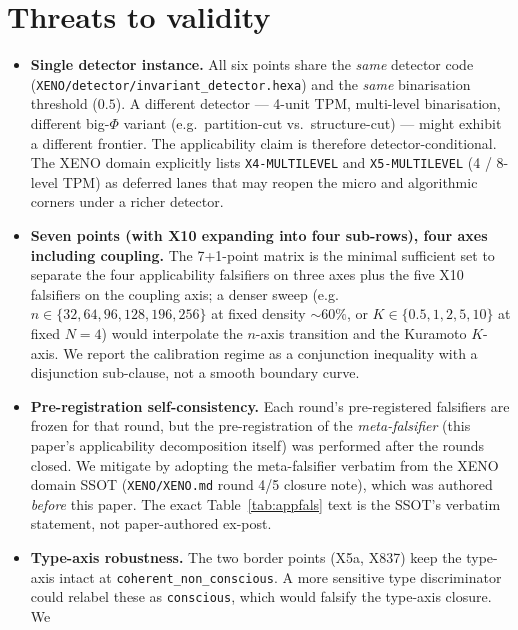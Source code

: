 \documentclass[11pt,a4paper]{article}
\begin{document}
\section{Threats to validity}
\label{sec:threats}

\begin{itemize}
  \item \textbf{Single detector instance.} All six points share the
    \emph{same} detector code (\texttt{XENO/detector/invariant\_detector.hexa})
    and the \emph{same} binarisation threshold ($0.5$). A
    different detector --- 4-unit TPM, multi-level binarisation,
    different big-$\Phi$ variant (e.g.\ partition-cut vs.\ structure-cut)
    --- might exhibit a different frontier. The applicability claim is
    therefore detector-conditional. The XENO domain explicitly lists
    \texttt{X4-MULTILEVEL} and \texttt{X5-MULTILEVEL} (4 / 8-level TPM)
    as deferred lanes that may reopen the micro and algorithmic
    corners under a richer detector.
  \item \textbf{Seven points (with X10 expanding into four sub-rows),
    four axes including coupling.} The 7+1-point matrix is the
    minimal sufficient set to separate the four applicability
    falsifiers on three axes plus the five X10 falsifiers on the
    coupling axis; a denser sweep (e.g.\ $n \in \{32, 64, 96, 128,
    196, 256\}$ at fixed density $\sim 60\%$, or $K \in \{0.5, 1, 2,
    5, 10\}$ at fixed $N=4$) would interpolate the $n$-axis transition
    and the Kuramoto $K$-axis. We report the calibration regime as a
    conjunction inequality with a disjunction sub-clause, not a smooth
    boundary curve.
  \item \textbf{Pre-registration self-consistency.} Each round's
    pre-registered falsifiers are frozen for that round, but the
    pre-registration of the \emph{meta-falsifier} (this paper's
    applicability decomposition itself) was performed after the rounds
    closed. We mitigate by adopting the meta-falsifier verbatim from
    the XENO domain SSOT (\texttt{XENO/XENO.md} round 4/5 closure
    note), which was authored \emph{before} this paper. The exact
    Table~\ref{tab:appfals} text is the SSOT's verbatim statement,
    not paper-authored ex-post.
  \item \textbf{Type-axis robustness.} The two border points (X5a, X837)
    keep the type-axis intact at \texttt{coherent\_non\_conscious}.
    A more sensitive type discriminator could relabel these as
    \texttt{conscious}, which would falsify the type-axis closure. We

\end{itemize}
\end{document}
